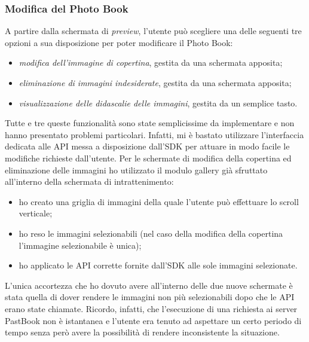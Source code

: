 			\subsubsection{Modifica del Photo Book}
				A partire dalla schermata di \emph{preview}, l'utente può scegliere una delle seguenti tre opzioni a sua
				disposizione per poter modificare il Photo Book:
				\begin{itemize}
					\item \emph{modifica dell'immagine di copertina}, gestita da una schermata apposita;
					\item \emph{eliminazione di immagini indesiderate}, gestita da una schermata apposita;
					\item \emph{visualizzazione delle didascalie delle immagini}, gestita da un semplice tasto.
				\end{itemize}
				Tutte e tre queste funzionalità sono state semplicissime da implementare e non hanno presentato problemi particolari.
				Infatti, mi è bastato utilizzare l'interfaccia dedicata alle API messa a disposizione dall'SDK per attuare in modo
				facile le modifiche richieste dall'utente. Per le schermate di modifica della copertina ed eliminazione delle
				immagini ho utilizzato il modulo gallery già sfruttato all'interno della schermata di intrattenimento:
				\begin{itemize}
					\item ho creato una griglia di immagini della quale l'utente può effettuare lo scroll verticale;
					\item ho reso le immagini selezionabili (nel caso della modifica della copertina l'immagine selezionabile è
					unica);
					\item ho applicato le API corrette fornite dall'SDK alle sole immagini selezionate.
				\end{itemize}
				L'unica accortezza che ho dovuto avere all'interno delle due nuove schermate è stata quella di dover rendere le
				immagini non più selezionabili dopo che le API erano state chiamate. Ricordo, infatti, che l'esecuzione di una
				richiesta ai server PastBook non è istantanea e l'utente era tenuto ad aspettare un certo periodo di tempo senza però
				avere la possibilità di rendere inconsistente la situazione.\\
				
